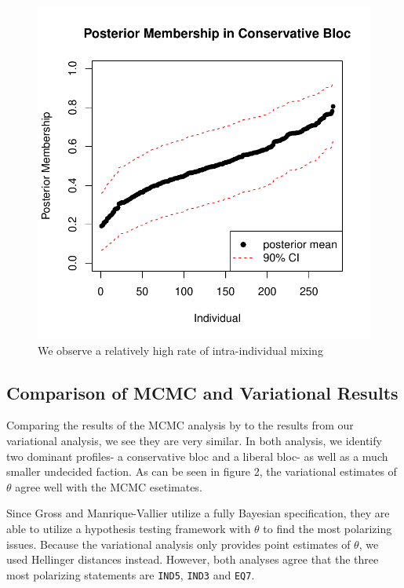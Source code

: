 \documentclass{article}\usepackage[]{graphicx}\usepackage[]{color}
\makeatletter
\def\maxwidth{ %
  \ifdim\Gin@nat@width>\linewidth
    \linewidth
  \else
    \Gin@nat@width
  \fi
}
\newenvironment{knitrout}{}{} %
\renewenvironment{knitrout}{\begin{singlespace}}{\end{singlespace}}
\makeatother
\begin{document}
\begin{knitrout}
\begin{figure}
{\centering \includegraphics[width=\maxwidth]{figure/posteriorMem-1} 

}

\caption[We observe a relatively high rate of intra-individual mixing]{We observe a relatively high rate of intra-individual mixing\label{fig:posteriorMem}}
\end{figure}


\end{knitrout}


\subsection{Comparison of MCMC and Variational Results}
Comparing the results of the MCMC analysis by \cite{grossManriqueVallier} to the results from our variational analysis, we see they are very similar. In both analysis, we identify two dominant profiles- a conservative bloc and a liberal bloc- as well as a much smaller undecided faction. As can be seen in figure 2, the variational estimates of $\theta$ agree well with the MCMC esetimates.

Since Gross and Manrique-Vallier utilize a fully Bayesian specification, they  are able to utilize a hypothesis testing framework with $\theta$ to find the most polarizing issues. Because the variational analysis only provides point estimates of $\theta$, we used Hellinger distances instead. However, both analyses agree that the three most polarizing statements are  \texttt{IND5}, \texttt{IND3} and \texttt{EQ7}.
\end{document}
